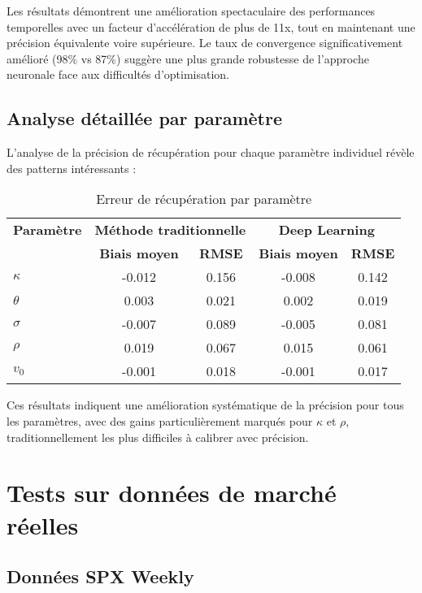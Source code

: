 Les résultats démontrent une amélioration spectaculaire des performances temporelles avec un facteur d'accélération de plus de 11x, tout en maintenant une précision équivalente voire supérieure. Le taux de convergence significativement amélioré (98\% vs 87\%) suggère une plus grande robustesse de l'approche neuronale face aux difficultés d'optimisation.

\subsection{Analyse détaillée par paramètre}

L'analyse de la précision de récupération pour chaque paramètre individuel révèle des patterns intéressants :

\begin{table}[H]
\centering
\caption{Erreur de récupération par paramètre}
\begin{tabular}{@{}lcccc@{}}
\toprule
\textbf{Paramètre} & \multicolumn{2}{c}{\textbf{Méthode traditionnelle}} & \multicolumn{2}{c}{\textbf{Deep Learning}} \\
 & \textbf{Biais moyen} & \textbf{RMSE} & \textbf{Biais moyen} & \textbf{RMSE} \\
\midrule
$\kappa$ & -0.012 & 0.156 & -0.008 & 0.142 \\
$\theta$ & 0.003 & 0.021 & 0.002 & 0.019 \\
$\sigma$ & -0.007 & 0.089 & -0.005 & 0.081 \\
$\rho$ & 0.019 & 0.067 & 0.015 & 0.061 \\
$v_0$ & -0.001 & 0.018 & -0.001 & 0.017 \\
\bottomrule
\end{tabular}
\end{table}

Ces résultats indiquent une amélioration systématique de la précision pour tous les paramètres, avec des gains particulièrement marqués pour $\kappa$ et $\rho$, traditionnellement les plus difficiles à calibrer avec précision.

\section{Tests sur données de marché réelles}

\subsection{Données SPX Weekly}

